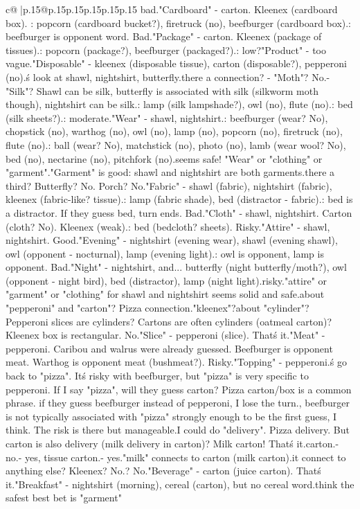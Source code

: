\documentclass{article}
\begin{document}
{\begin{supertabular}{c@{$\;$}|p{.15\linewidth}@{}p{.15\linewidth}p{.15\linewidth}p{.15\linewidth}p{.15\linewidth}p{.15\linewidth}}
{{{bad.\n\n"Cardboard" - carton. Kleenex (cardboard box). \nOpponent: popcorn (cardboard bucket?), firetruck (no), beefburger (cardboard box).\nRisk: beefburger is opponent word. Bad.\n\n"Package" - carton. Kleenex (package of tissues).\nOpponent: popcorn (package?), beefburger (packaged?).\nRisk: low?\n\n"Product" - too vague.\n\n"Disposable" - kleenex (disposable tissue), carton (disposable?), pepperoni (no).\n\nLet\'s look at shawl, nightshirt, butterfly.\nIs there a connection? \n- "Moth"? No.\n- "Silk"? Shawl can be silk, butterfly is associated with silk (silkworm moth though), nightshirt can be silk.\nOpponent: lamp (silk lampshade?), owl (no), flute (no).\nDistractor: bed (silk sheets?).\nRisk: moderate.\n\n"Wear" - shawl, nightshirt.\nAlso: beefburger (wear? No), chopstick (no), warthog (no), owl (no), lamp (no), popcorn (no), firetruck (no), flute (no).\nDistractor: ball (wear? No), matchstick (no), photo (no), lamb (wear wool? No), bed (no), nectarine (no), pitchfork (no).\nThis seems safe! "Wear" or "clothing" or "garment".\n"Garment" is good: shawl and nightshirt are both garments.\nIs there a third? Butterfly? No. Porch? No.\n\n"Fabric" - shawl (fabric), nightshirt (fabric), kleenex (fabric-like? tissue).\nOpponent: lamp (fabric shade), bed (distractor - fabric).\nRisk: bed is a distractor. If they guess bed, turn ends. Bad.\n\n"Cloth" - shawl, nightshirt. Carton (cloth? No). Kleenex (weak).\nDistractor: bed (bedcloth? sheets). Risky.\n\n"Attire" - shawl, nightshirt. Good.\n\n"Evening" - nightshirt (evening wear), shawl (evening shawl), owl (opponent - nocturnal), lamp (evening light).\nRisk: owl is opponent, lamp is opponent. Bad.\n\n"Night" - nightshirt, and... butterfly (night butterfly/moth?), owl (opponent - night bird), bed (distractor), lamp (night light).\nToo risky.\n\nSo "attire" or "garment" or "clothing" for shawl and nightshirt seems solid and safe.\n\nWhat about "pepperoni" and "carton"? Pizza connection.\nAnd "kleenex"?\nWhat about "cylinder"? Pepperoni slices are cylinders? Cartons are often cylinders (oatmeal carton)? Kleenex box is rectangular. No.\n\n"Slice" - pepperoni (slice). That\'s it.\n\n"Meat" - pepperoni. Caribou and walrus were already guessed. Beefburger is opponent meat. Warthog is opponent meat (bushmeat?). Risky.\n\n"Topping" - pepperoni.\n\nLet\'s go back to "pizza". It\'s risky with beefburger, but "pizza" is very specific to pepperoni. If I say "pizza", will they guess carton? Pizza carton/box is a common phrase. \nBut if they guess beefburger instead of pepperoni, I lose the turn.\nHowever, beefburger is not typically associated with "pizza" strongly enough to be the first guess, I think. The risk is there but manageable.\n\nOr I could do "delivery". Pizza delivery. But carton is also delivery (milk delivery in carton)? Milk carton! That\'s it.\nMilk carton.\nPepperoni - no.\nKleenex - yes, tissue carton.\nCarton - yes.\nSo "milk" connects to carton (milk carton).\nDoes it connect to anything else? Kleenex? No.\nNightshirt? No.\n\n"Beverage" - carton (juice carton). That\'s it.\n\n"Breakfast" - nightshirt (morning), cereal (carton), but no cereal word.\n\nI think the safest best bet is "garment" }}}
\end{supertabular}}
\end{document}

